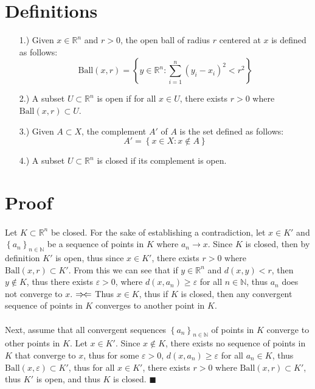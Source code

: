 \documentclass[12pt]{article}
\newcommand{\contradiction}{
    \ensuremath{{\Rightarrow\mspace{-2mu}\Leftarrow}}
}
\newcommand{\braces}[1]{\left\{#1\right\}}           %
\newcommand{\N}{\mathbb{N}}
\newcommand{\R}{\mathbb{R}}
\newcommand{\e}{\varepsilon}
\begin{document}
\pagestyle{fancy}
\fancyhead{}

\normalsize

\section*{Definitions}
\begin{itemize}
    \item [1.)] Given $x\in\R^n$ and $r>0$, the open ball of radius $r$ centered at $x$ is defined as follows:
    \[\text{Ball}(x,r)=\braces{y\in\R^n:\sum_{i=1}^n(y_i-x_i)^2<r^2}\]

    \item [2.)] A subset $U\subset\R^n$ is open if for all $x\in U$, there exists $r>0$ where $\text{Ball}(x,r)\subset U$.

    \item [3.)] Given $A\subset X$, the complement $A'$ of $A$ is the set defined as follows:
    \[A'=\braces{x\in X:x\notin A}\]

    \item [4.)] A subset $U\subset\R^n$ is closed if its complement is open.
\end{itemize}

\section*{Proof}

\paragraph{}
Let $K\subset\R^n$ be closed. For the sake of establishing a contradiction, let $x\in K'$ and $\braces{a_n}_{n\in\N}$ be a sequence of points in $K$ where $a_n\to x$. Since $K$ is closed, then by definition $K'$ is open, thus since $x\in K'$, there exists $r>0$ where $\text{Ball}(x,r)\subset K'$. From this we can see that if $y\in\R^n$ and $d(x,y)<r$, then $y\notin K$, thus there exists $\e>0$, where $d(x,a_n)\geq\e$ for all $n\in\N$, thus $a_n$ does not converge to $x$.\contradiction Thus $x\in K$, thus if $K$ is closed, then any convergent sequence of points in $K$ converges to another point in $K$.

\paragraph{}
Next, assume that all convergent sequences $\braces{a_n}_{n\in\N}$ of points in $K$ converge to other points in $K$. Let $x\in K'$. Since $x\notin K$, there exists no sequence of points in $K$ that converge to $x$, thus for some $\e>0$, $d(x,a_n)\geq\e$ for all $a_n\in K$, thus $\text{Ball}(x,\e)\subset K'$, thus for all $x\in K'$, there exists $r>0$ where $\text{Ball}(x,r)\subset K'$, thus $K'$ is open, and thus $K$ is closed. $\blacksquare$
\end{document}
